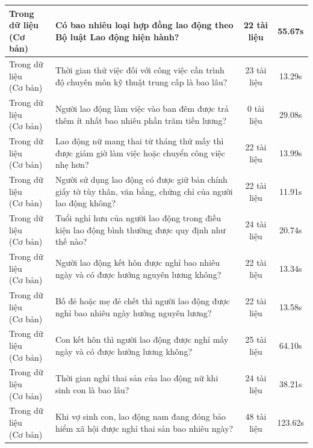 \begin{longtable}{|l|p{6.5cm}|c|c|}
\makecell[l]{Trong dữ liệu\\(Cơ bản)} & Có bao nhiêu loại hợp đồng lao động theo Bộ luật Lao động hiện hành? & 22 tài liệu & 55.67s \\ \hline
\makecell[l]{Trong dữ liệu\\(Cơ bản)} & Thời gian thử việc đối với công việc cần trình độ chuyên môn kỹ thuật trung cấp là bao lâu? & 23 tài liệu & 13.29s \\ \hline
\makecell[l]{Trong dữ liệu\\(Cơ bản)} & Người lao động làm việc vào ban đêm được trả thêm ít nhất bao nhiêu phần trăm tiền lương? & 0 tài liệu & 29.08s \\ \hline
\makecell[l]{Trong dữ liệu\\(Cơ bản)} & Lao động nữ mang thai từ tháng thứ mấy thì được giảm giờ làm việc hoặc chuyển công việc nhẹ hơn? & 22 tài liệu & 13.99s \\ \hline
\makecell[l]{Trong dữ liệu\\(Cơ bản)} & Người sử dụng lao động có được giữ bản chính giấy tờ tùy thân, văn bằng, chứng chỉ của người lao động không? & 22 tài liệu & 11.91s \\ \hline
\makecell[l]{Trong dữ liệu\\(Cơ bản)} & Tuổi nghỉ hưu của người lao động trong điều kiện lao động bình thường được quy định như thế nào? & 24 tài liệu & 20.74s \\ \hline
\makecell[l]{Trong dữ liệu\\(Cơ bản)} & Người lao động kết hôn được nghỉ bao nhiêu ngày và có được hưởng nguyên lương không? & 22 tài liệu & 13.34s \\ \hline
\makecell[l]{Trong dữ liệu\\(Cơ bản)} & Bố đẻ hoặc mẹ đẻ chết thì người lao động được nghỉ bao nhiêu ngày hưởng nguyên lương? & 22 tài liệu & 13.58s \\ \hline
\makecell[l]{Trong dữ liệu\\(Cơ bản)} & Con kết hôn thì người lao động được nghỉ mấy ngày và có được hưởng lương không? & 25 tài liệu & 64.10s \\ \hline
\makecell[l]{Trong dữ liệu\\(Cơ bản)} & Thời gian nghỉ thai sản của lao động nữ khi sinh con là bao lâu? & 24 tài liệu & 38.21s \\ \hline
\makecell[l]{Trong dữ liệu\\(Cơ bản)} & Khi vợ sinh con, lao động nam đang đóng bảo hiểm xã hội được nghỉ thai sản bao nhiêu ngày? & 48 tài liệu & 123.62s \\ \hline

\end{longtable}
